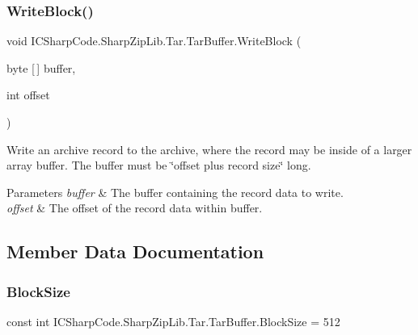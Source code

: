 \subsubsection{\texorpdfstring{Write\+Block()}{WriteBlock()}\hspace{0.1cm}{\footnotesize\ttfamily [2/2]}}
{\footnotesize\ttfamily void I\+C\+Sharp\+Code.\+Sharp\+Zip\+Lib.\+Tar.\+Tar\+Buffer.\+Write\+Block (\begin{DoxyParamCaption}\item[{byte \mbox{[}$\,$\mbox{]}}]{buffer,  }\item[{int}]{offset }\end{DoxyParamCaption})\hspace{0.3cm}{\ttfamily [inline]}}



Write an archive record to the archive, where the record may be inside of a larger array buffer. The buffer must be \char`\"{}offset plus
record size\char`\"{} long. 


\begin{DoxyParams}{Parameters}
{\em buffer} & The buffer containing the record data to write. \\
\hline
{\em offset} & The offset of the record data within buffer. \\
\hline
\end{DoxyParams}


\subsection{Member Data Documentation}
\mbox{\label{class_i_c_sharp_code_1_1_sharp_zip_lib_1_1_tar_1_1_tar_buffer_a99cabe6ecd1046ab392bd6ed33bda07a}} 
\subsubsection{\texorpdfstring{Block\+Size}{BlockSize}}
{\footnotesize\ttfamily const int I\+C\+Sharp\+Code.\+Sharp\+Zip\+Lib.\+Tar.\+Tar\+Buffer.\+Block\+Size = 512}



